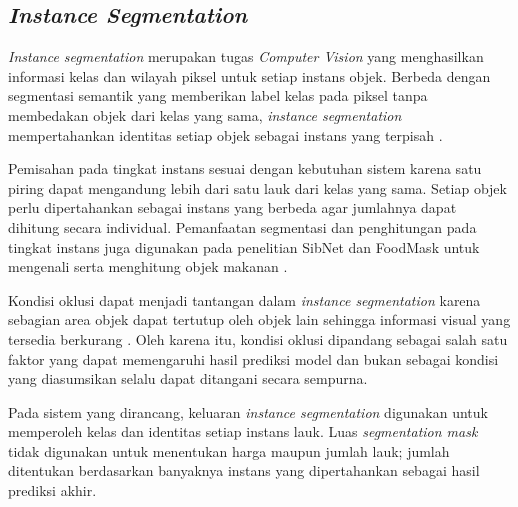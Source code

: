 \subsection{\textit{Instance Segmentation}}

\textit{Instance segmentation} merupakan tugas \textit{Computer Vision} yang menghasilkan informasi kelas dan wilayah piksel untuk setiap instans objek. Berbeda dengan segmentasi semantik yang memberikan label kelas pada piksel tanpa membedakan objek dari kelas yang sama, \textit{instance segmentation} mempertahankan identitas setiap objek sebagai instans yang terpisah \cite{he2017maskrcnn}.

Pemisahan pada tingkat instans sesuai dengan kebutuhan sistem karena satu piring dapat mengandung lebih dari satu lauk dari kelas yang sama. Setiap objek perlu dipertahankan sebagai instans yang berbeda agar jumlahnya dapat dihitung secara individual. Pemanfaatan segmentasi dan penghitungan pada tingkat instans juga digunakan pada penelitian SibNet dan FoodMask untuk mengenali serta menghitung objek makanan \cite{nguyen2022sibnet,nguyen2023foodmask}.

Kondisi oklusi dapat menjadi tantangan dalam \textit{instance segmentation} karena sebagian area objek dapat tertutup oleh objek lain sehingga informasi visual yang tersedia berkurang \cite{ke2021}. Oleh karena itu, kondisi oklusi dipandang sebagai salah satu faktor yang dapat memengaruhi hasil prediksi model dan bukan sebagai kondisi yang diasumsikan selalu dapat ditangani secara sempurna.

Pada sistem yang dirancang, keluaran \textit{instance segmentation} digunakan untuk memperoleh kelas dan identitas setiap instans lauk. Luas \textit{segmentation mask} tidak digunakan untuk menentukan harga maupun jumlah lauk; jumlah ditentukan berdasarkan banyaknya instans yang dipertahankan sebagai hasil prediksi akhir.
